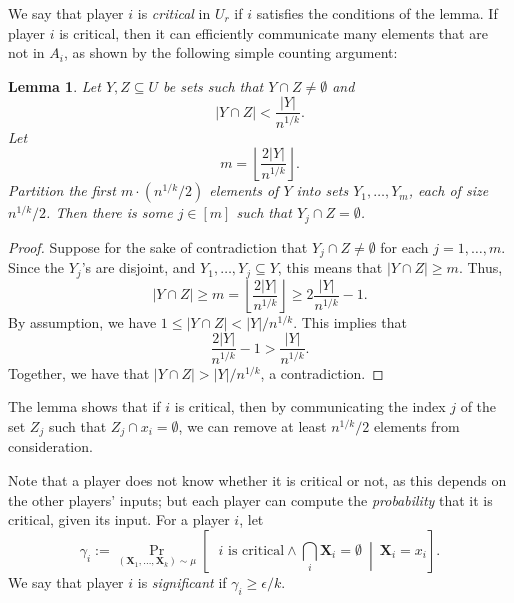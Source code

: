 \documentclass{article}
\newcommand{\coloneq}{:=}
\newcommand{\eps}{\epsilon}
\newcommand{\given}{\medspace \middle| \medspace}
\newcommand{\rv}[1]{\mathbf{#1}}
\theoremstyle{plain}
\newtheorem{lemma}[theorem]{Lemma}
\begin{document}
We say that player $i$ is \emph{critical} in $U_r$ if $i$ satisfies the conditions of the lemma.
If player $i$ is critical, then it can efficiently communicate many elements that are not in $A_i$, as shown
by the following simple counting argument:
\begin{lemma}
  Let $Y,Z \subseteq U$ be sets such that $Y \cap Z \neq \emptyset$ and
  \begin{equation*}
    |Y \cap Z| < \frac{|Y|}{n^{1/k}}.
  \end{equation*}
  Let
  \begin{equation*}
    m = \left\lfloor \frac{2|Y|}{n^{1/k}} \right\rfloor.
  \end{equation*}
  Partition the first $m \cdot (n^{1/k}/2)$ elements of $Y$ into sets $Y_1,\ldots,Y_m$,
  each of size $n^{1/k}/2$.
  Then there is some $j \in [m]$ such that $Y_j \cap Z = \emptyset$.
  \label{lemma:reduce}
\end{lemma}  
\begin{proof}
  Suppose for the sake of contradiction that $Y_j \cap Z \neq \emptyset$ for each $j = 1,\ldots,m$.
  Since the $Y_j$'s are disjoint,
  and $Y_1,\ldots,Y_j \subseteq Y$,
  this means that $|Y \cap Z| \geq m$.
  Thus,
  \begin{equation*}
    |Y \cap Z| \geq m = \left\lfloor \frac{2|Y|}{n^{1/k}} \right\rfloor
    \geq
    2\frac{|Y|}{n^{1/k}} - 1.
  \end{equation*}
  By assumption, we have $1 \leq |Y \cap Z| < |Y| / n^{1/k}$.
  This implies that
  \begin{equation*}
    \frac{2|Y|}{n^{1/k}} - 1 > \frac{|Y|}{n^{1/k}}.
  \end{equation*}
  Together, we have that $|Y \cap Z| > |Y| / n^{1/k}$, a contradiction.
\end{proof}
The lemma shows that if $i$ is critical, then by communicating the index $j$ of the set $Z_j$ such that $Z_j \cap x_i = \emptyset$,
we can remove at least $n^{1/k}/2$ elements from consideration.

Note that a player does not know whether it is critical or not, as this depends 
on the other players' inputs;
but each player can compute the \emph{probability} that it is critical, given its input.
For a player $i$,
let
\begin{equation*}
  \gamma_i \coloneq \Pr_{(\rv{X}_1,\ldots,\rv{X}_k) \sim \mu}\left[ \text{ $i$ is critical} \land \bigcap_i \rv{X}_i = \emptyset \given \rv{X}_i = x_i \right].
\end{equation*}
We say that player $i$ is \emph{significant} if $\gamma_i \geq \eps / k$.
\end{document}
